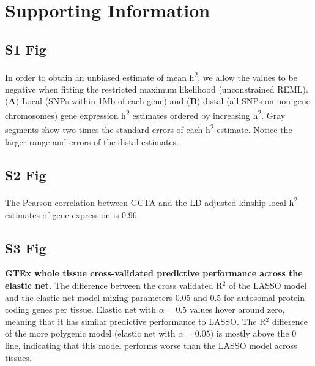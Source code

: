 \documentclass[10pt,letterpaper]{article}
\begin{document}


\section*{Supporting Information}

\begin{singlespace}

\subsection*{S1 Fig}
\label{S1_Fig}

In order to obtain an unbiased estimate of mean h\textsuperscript{2}, we allow the values to be negative when fitting the restricted maximum likelihood (unconstrained REML). (\textbf{A}) Local (SNPs within 1Mb of each gene) and (\textbf{B}) distal (all SNPs on non-gene chromosomes) gene expression h\textsuperscript{2} estimates ordered by increasing h\textsuperscript{2}. Gray segments show two times the standard errors of each h\textsuperscript{2} estimate. Notice the larger range and errors of the distal estimates.

\pagebreak

\subsection*{S2 Fig}
\label{S2_Fig}

 The Pearson correlation between GCTA and the LD-adjusted kinship local h\textsuperscript{2} estimates of gene expression is 0.96.

\subsection*{S3 Fig}
\label{S3_Fig}
{\bf GTEx whole tissue cross-validated predictive performance across the elastic net.} The difference between the cross validated R$^2$ of the LASSO model and the elastic net model mixing parameters 0.05 and 0.5 for autosomal protein coding genes per tissue. Elastic net with $\alpha=0.5$ values hover around zero, meaning that it has similar predictive performance to LASSO. The R$^2$ difference of the more polygenic model (elastic net with $\alpha=0.05$) is mostly above the 0 line, indicating that this model performs worse than the LASSO model across tissues.


\end{singlespace}
\end{document}
